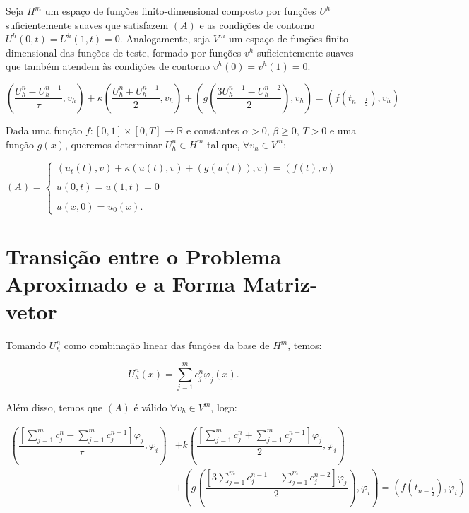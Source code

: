   Seja $H^m$ um espaço de funções finito-dimensional composto por funções $U^h$ suficientemente suaves que satisfazem $(A)$ e as condições de contorno $U^h(0,t) = U^h(1,t) = 0$. Analogamente, seja $V^m$ um espaço de funções finito-dimensional das funções de teste, formado por funções $v^h$ suficientemente suaves que também atendem às condições de contorno $v^h(0) = v^h(1) = 0$.


  \[\left(\dfrac{U_h^n - U_h^{n-1}}{\tau}, v_h\right) + \kappa\left(\dfrac{U_h^n + U_h^{n-1}}{2}, v_h\right) + \left(g\left(\dfrac{3U_h^{n-1} - U_h^{n-2}}{2}\right), v_h\right) = (f(t_{n - \frac{1}{2}}), v_h)\]

  Dada uma função $f : [0,1] \times [0,T] \to \mathbb{R}$ e constantes $\alpha > 0$, $\beta \geq 0$, $T > 0$ e uma função $g(x)$, queremos determinar $U_h^n \in H^m$ tal que, $\forall v_h \in V^m$:

  \begin{center}
    $(A) = \begin{cases}
      (u_t(t), v) + \kappa(u(t), v) + (g(u(t)), v) = (f(t), v) \\\\
      u(0,t) = u(1,t) = 0 \\\\
      u(x,0) = u_0(x).
    \end{cases}$
  \end{center}


\section{Transição entre o Problema Aproximado e a Forma Matriz-vetor}

  Tomando $U_h^n$ como combinação linear das funções da base de $H^m$, temos:

  \[U_h^n(x) = \sum_{j=1}^{m} c_j^n \varphi_j(x).\]

  Além disso, temos que $(A)$ é válido $\forall v_h \in V^m$, logo:

  \begin{align*}
    \left(\dfrac{\left[\sum_{j=1}^{m} c_j^n - \sum_{j=1}^{m} c_j^{n-1}\right]\varphi_j}{\tau}, \varphi_i\right) &+ k\left(\dfrac{\left[\sum_{j=1}^{m} c_j^n + \sum_{j=1}^{m} c_j^{n-1}\right]\varphi_j}{2}, \varphi_i\right) \\
    &+ \left(g\left(\dfrac{\left[3 \sum_{j=1}^{m} c_j^{n-1} - \sum_{j=1}^{m} c_j^{n-2}\right]\varphi_j}{2}\right), \varphi_i\right) = (f(t_{n - \frac{1}{2}}), \varphi_i)
  \end{align*}

